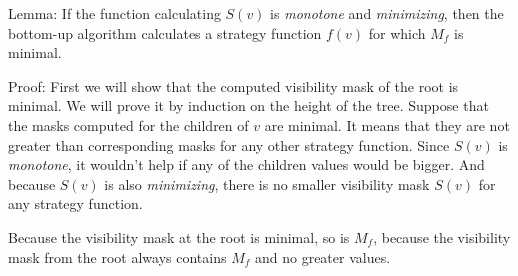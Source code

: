 Lemma: If the function calculating $S(v)$ is \emph{monotone} and \emph{minimizing}, then
the bottom-up algorithm calculates a strategy function $f(v)$ for which $M_f$ is minimal.

Proof: First we will show that the computed visibility mask of the root is minimal. We will
prove it by induction on the height of the tree. Suppose that the masks computed for the
children of $v$ are minimal. It means that they are not greater than corresponding masks for
any other strategy function. Since $S(v)$ is \emph{monotone}, it wouldn't help if
any of the children values would be bigger. And because $S(v)$ is also \emph{minimizing},
there is no smaller visibility mask $S(v)$ for any strategy function.

Because the visibility mask at the root is minimal, so is $M_f$, because the visibility mask
from the root always contains $M_f$ and no greater values.
